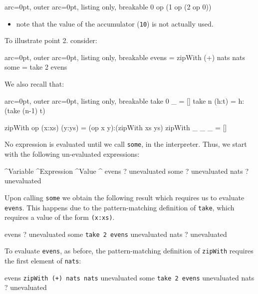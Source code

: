 \begin{tcblisting}{ arc=0pt, outer arc=0pt, listing only, breakable}
0 op (1 op (2 op 0)) 

\end{tcblisting}

  \begin{itemize}
  	\item  note that the value of the accumulator (\texttt{10}) is not actually used.
  \end{itemize}

To illustrate point 2. consider:

\begin{tcblisting}{ arc=0pt, outer arc=0pt, listing only, breakable}
evens = zipWith (+) nats nats
some = take 2 evens

\end{tcblisting}


We also recall that:

\begin{tcblisting}{ arc=0pt, outer arc=0pt, listing only, breakable}
take 0 _ = []
take n (h:t) = h:(take (n-1) t)

zipWith op (x:xs) (y:ys) = (op x y):(zipWith xs ys)
zipWith _ _ _ = []

\end{tcblisting}


No expression is evaluated until we call \texttt{some}, in the interpreter. Thus, we start with the following un-evaluated expressions:

\textasciicircum  Variable \textasciicircum  Expression \textasciicircum  Value \textasciicircum 
\textbar evens \textbar ? \textbar unevaluated \textbar
\textbar some \textbar ? \textbar unevaluated \textbar
\textbar nats \textbar ? \textbar unevaluated \textbar



Upon calling \texttt{some} we obtain the following result which requires us to evaluate \texttt{evens}. This happens due to the pattern-matching definition of \texttt{take}, which requires a value of the form \texttt{(x:xs)}.

\textbar evens \textbar ? \textbar unevaluated \textbar
\textbar some \textbar \texttt{take 2 evens} \textbar unevaluated \textbar
\textbar nats \textbar ? \textbar unevaluated \textbar


To evaluate \texttt{evens}, as before, the pattern-matching definition of \texttt{zipWith} requires the first element of \texttt{nats}:

\textbar evens \textbar \texttt{zipWith (+) nats nats} \textbar unevaluated \textbar
\textbar some \textbar \texttt{take 2 evens} \textbar unevaluated \textbar
\textbar nats \textbar ? \textbar unevaluated \textbar


